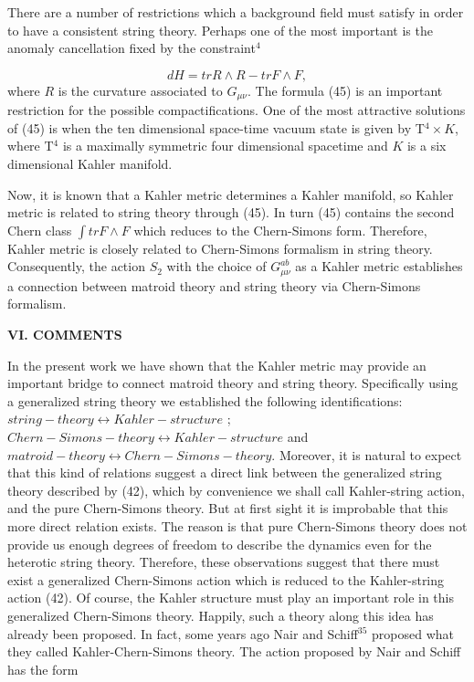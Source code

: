 \documentclass[a4paper,12pt]{article}
\begin{document}
There are a number of restrictions which a background field must satisfy in
order to have a consistent string theory. Perhaps one of the most important
is the anomaly cancellation fixed by the constraint$^{4}$

\begin{equation}
dH=trR\wedge R-trF\wedge F,  \label{45}
\end{equation}
where $R$ is the curvature associated to $G_{\mu \nu }$. The formula (45) is
an important restriction for the possible compactifications. One of the most
attractive solutions of (45) is when the ten dimensional space-time vacuum
state is given by T$^{4}\times K$, where T$^{4}$ is a maximally symmetric
four dimensional spacetime and $K$ is a six dimensional Kahler manifold.

Now, it is known that a Kahler metric determines a Kahler manifold, so
Kahler metric is related to string theory through (45). In turn (45)
contains the second Chern class $\int trF\wedge F$ which reduces to the
Chern-Simons form. Therefore, Kahler metric is closely related to
Chern-Simons formalism in string theory. Consequently, the action $S_{2}$
with the choice of $G_{\mu \nu }^{ab}$ as a Kahler metric establishes a
connection between matroid theory and string theory via Chern-Simons
formalism.
\bigskip

\smallskip

\noindent \textbf{VI. COMMENTS}

\bigskip

In the present work we have shown that the Kahler metric may provide an
important bridge to connect matroid theory and string theory. Specifically
using a generalized string theory we established the following
identifications: $string-theory\leftrightarrow Kahler-structure$ ; $%
Chern-Simons-theory\leftrightarrow Kahler-structure$ and $%
matroid-theory\leftrightarrow Chern-Simons-theory$. Moreover, it is natural
to expect that this kind of relations suggest a direct link between the
generalized string theory described by (42), which by convenience we shall
call Kahler-string action, and the pure Chern-Simons theory. But at first
sight it is improbable that this more direct relation exists. The reason is
that pure Chern-Simons theory does not provide us enough degrees of freedom
to describe the dynamics even for the heterotic string theory. Therefore,
these observations suggest that there must exist a generalized Chern-Simons
action which is reduced to the Kahler-string action (42). Of course, the
Kahler structure must play an important role in this generalized
Chern-Simons theory. Happily, such a theory along this idea has already been
proposed. In fact, some years ago Nair and Schiff$^{35}$ proposed what they
called Kahler-Chern-Simons theory. The action proposed by Nair and Schiff
has the form
\end{document}
